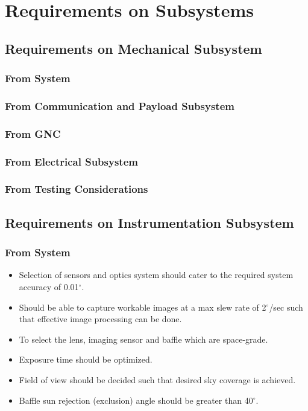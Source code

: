 \documentclass[../../main.tex]{subfiles}
\begin{document}
\chapter{Requirements on Subsystems}
\thispagestyle{fancy}

\section{Requirements on Mechanical Subsystem}
\subsection{From System}
\subsection{From Communication and Payload Subsystem} 
\subsection{From GNC} 
\subsection{From Electrical Subsystem}
\subsection {From Testing Considerations} 


\newpage
\section{Requirements on Instrumentation Subsystem}
\subsection{From System}
\begin{itemize}
    \item Selection of sensors and optics system should cater to the required system accuracy of 0.01$^{\circ}$.
    \item Should be able to capture workable images at a max slew rate of 2$^{\circ}$/sec such that effective image processing can be done.
    \item To select the lens, imaging sensor and baffle which are space-grade.
    \item Exposure time should be optimized.
    \item Field of view should be decided such that desired sky coverage is achieved.
    \item Baffle sun rejection (exclusion) angle should be greater than 40$^{\circ}$.
\end{itemize}
\end{document}
